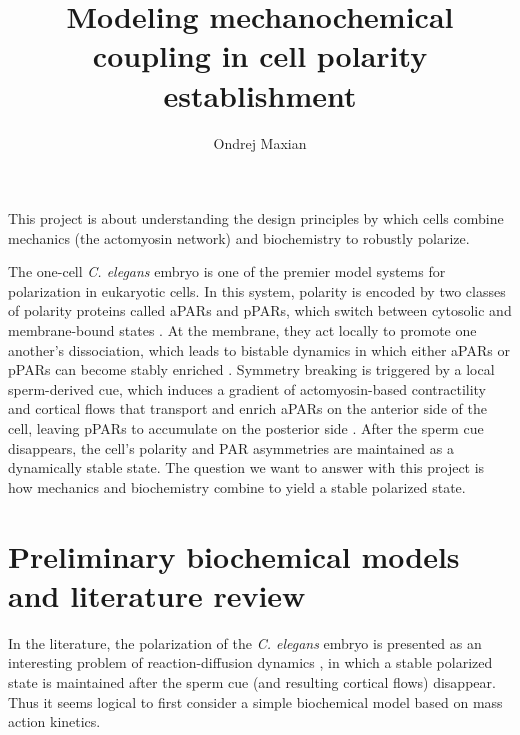 \documentclass[11pt]{article}
\title{Modeling mechanochemical coupling in cell polarity establishment  \vspace{-0.5 cm}}
\author{Ondrej Maxian  \vspace{-0.75 cm}}
\newcommand{\6}[1]{#1_{\text{6}}}
\newcommand{\3}[1]{#1_{\text{3}}}
\begin{document}
\maketitle
This project is about understanding the design principles by which cells combine mechanics (the actomyosin network) and biochemistry to robustly polarize. 

\iffalse
The one-cell \emph{C. elegans} embryo is one of the premier model systems for polarization in eukaryotic cells. In this system, polarity is encoded by two classes of polarity proteins called aPARs and pPARs, which switch between cytosolic and membrane-bound states \cite{goehring2011proteins}. At the membrane, they act locally to promote one another's dissociation, which leads to bistable dynamics in which either aPARs or pPARs can become stably enriched \cite{dawes20113}. Symmetry breaking is triggered by a local sperm-derived cue, which induces a gradient of actomyosin-based contractility and cortical flows that transport and enrich aPARs on the anterior side of the cell, leaving pPARs to accumulate on the posterior side \cite{goehring2011polarization, munro2004cortical}. %
After the sperm cue disappears, the cell's polarity and PAR asymmetries are maintained as a dynamically stable state. The question we want to answer with this project is how mechanics and biochemistry combine to yield a stable polarized state.

\section{Preliminary biochemical models and literature review}
In the literature, the polarization of the \emph{C. elegans} embryo is presented as an interesting problem of reaction-diffusion dynamics \cite{halatek2018self}, in which a stable polarized state is maintained after the sperm cue (and resulting cortical flows) disappear. Thus it seems logical to first consider a simple biochemical model based on mass action kinetics. 
\end{document}

